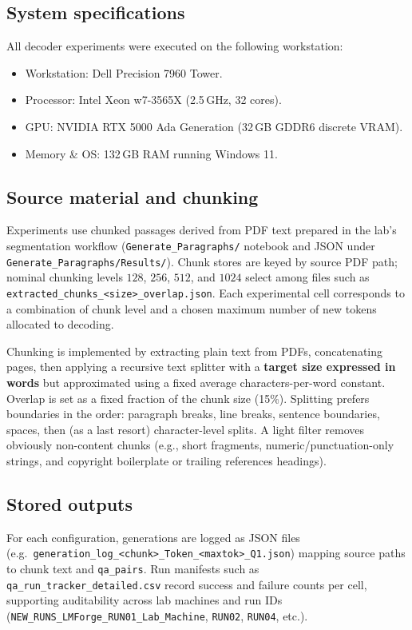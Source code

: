 \documentclass[11pt]{article}
\begin{document}
\subsection{System specifications}

All decoder experiments were executed on the following workstation:
\begin{itemize}[noitemsep]
    \item Workstation: Dell Precision 7960 Tower.
    \item Processor: Intel Xeon w7-3565X (2.5\,GHz, 32 cores).
    \item GPU: NVIDIA RTX 5000 Ada Generation (32\,GB GDDR6 discrete VRAM).
    \item Memory \& OS: 132\,GB RAM running Windows 11.
\end{itemize}

\subsection{Source material and chunking}

Experiments use chunked passages derived from PDF text prepared in the lab's segmentation workflow (\texttt{Generate\_Paragraphs/} notebook and JSON under \texttt{Generate\_Paragraphs/Results/}). Chunk stores are keyed by source PDF path; nominal chunking levels $128$, $256$, $512$, and $1024$ select among files such as \texttt{extracted\_chunks\_<size>\_overlap.json}. Each experimental cell corresponds to a combination of chunk level and a chosen maximum number of new tokens allocated to decoding.

Chunking is implemented by extracting plain text from PDFs, concatenating pages, then applying a recursive text splitter with a \textbf{target size expressed in words} but approximated using a fixed average characters-per-word constant. Overlap is set as a fixed fraction of the chunk size (15\%). Splitting prefers boundaries in the order: paragraph breaks, line breaks, sentence boundaries, spaces, then (as a last resort) character-level splits. A light filter removes obviously non-content chunks (e.g., short fragments, numeric/punctuation-only strings, and copyright boilerplate or trailing references headings).

\subsection{Stored outputs}

For each configuration, generations are logged as JSON files (e.g.\ \texttt{generation\_log\_<chunk>\_Token\_<maxtok>\_Q1.json}) mapping source paths to chunk text and \texttt{qa\_pairs}. Run manifests such as \texttt{qa\_run\_tracker\_detailed.csv} record success and failure counts per cell, supporting auditability across lab machines and run IDs (\texttt{NEW\_RUNS\_LMForge\_RUN01\_Lab\_Machine}, \texttt{RUN02}, \texttt{RUN04}, etc.).
\end{document}
